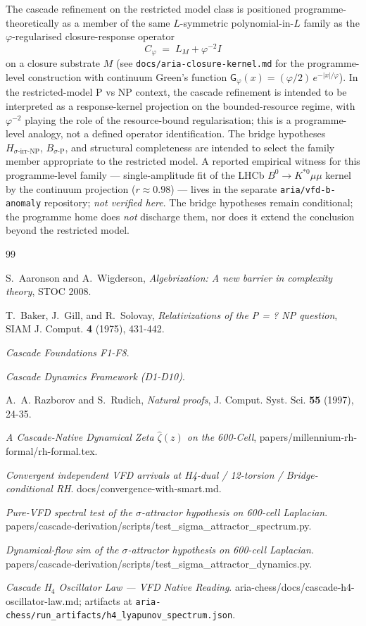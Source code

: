 \documentclass[11pt, a4paper]{amsart}
\theoremstyle{definition}
\begin{document}
The cascade refinement on the restricted model class is positioned
programme-theoretically as a member of the same $L$-symmetric
polynomial-in-$L$ family as the $\varphi$-regularised
closure-response operator
\[
C_\varphi \;=\; L_M + \varphi^{-2} I
\]
on a closure substrate $M$ (see
\texttt{docs/aria-closure-kernel.md} for the programme-level
construction with continuum Green's function
$\mathsf G_\varphi(x) = (\varphi/2)\,e^{-|x|/\varphi}$).  In the
restricted-model P vs NP context, the cascade refinement is
intended to be interpreted as a response-kernel projection on the
bounded-resource regime, with $\varphi^{-2}$ playing the role of
the resource-bound regularisation; this is a programme-level
analogy, not a defined operator identification.  The bridge hypotheses
$H_{\sigma\text{-irr-NP}}$, $B_{\sigma\text{-P}}$, and structural
completeness are intended to select the family member appropriate
to the restricted model.  A reported empirical witness for this programme-level family
--- single-amplitude fit of the LHCb $B^0\to K^{*0}\mu\mu$ kernel
by the continuum projection ($r \approx 0.98$) --- lives in the
separate \texttt{aria/vfd-b-anomaly} repository; \emph{not
verified here}.  The bridge hypotheses remain conditional; the
programme home does \emph{not} discharge them, nor does it extend
the conclusion beyond the restricted model.

\begin{thebibliography}{99}

S.~Aaronson and A.~Wigderson, \emph{Algebrization: A new barrier in
complexity theory}, STOC 2008.

T.~Baker, J.~Gill, and R.~Solovay, \emph{Relativizations of the P = ?
NP question}, SIAM J. Comput. \textbf{4} (1975), 431-442.

\emph{Cascade Foundations F1-F8}.

\emph{Cascade Dynamics Framework (D1-D10)}.

A.~A. Razborov and S.~Rudich, \emph{Natural proofs},
J. Comput. Syst. Sci. \textbf{55} (1997), 24-35.

\emph{A Cascade-Native Dynamical Zeta $\widehat\zeta(z)$ on the
600-Cell}, papers/millennium-rh-formal/rh-formal.tex.

\emph{Convergent independent VFD arrivals at H4-dual / 12-torsion /
Bridge-conditional RH}. docs/convergence-with-smart.md.

\emph{Pure-VFD spectral test of the $\sigma$-attractor hypothesis on
600-cell Laplacian}.
papers/cascade-derivation/scripts/test\_sigma\_attractor\_spectrum.py.

\emph{Dynamical-flow sim of the $\sigma$-attractor hypothesis on
600-cell Laplacian}.
papers/cascade-derivation/scripts/test\_sigma\_attractor\_dynamics.py.

\emph{Cascade H$_4$ Oscillator Law — VFD Native Reading}.
aria-chess/docs/cascade-h4-oscillator-law.md;
artifacts at \texttt{aria-chess/run\_artifacts/h4\_lyapunov\_spectrum.json}.

\end{thebibliography}
\end{document}
